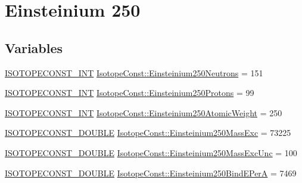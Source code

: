 \hypertarget{group___isotope_const-_einsteinium-_es250}{}\section{Einsteinium 250}
\label{group___isotope_const-_einsteinium-_es250}
\subsection*{Variables}
\begin{DoxyCompactItemize}
\item 
\mbox{\hyperlink{group___isotope_const-_macros_ga5f18360b3e99483a35c32d789e62621c}{I\+S\+O\+T\+O\+P\+E\+C\+O\+N\+S\+T\+\_\+\+I\+NT}} \mbox{\hyperlink{group___isotope_const-_einsteinium-_es250_ga4d4bc806f06901da5590238cf802968a}{Isotope\+Const\+::\+Einsteinium250\+Neutrons}} = 151
\item 
\mbox{\hyperlink{group___isotope_const-_macros_ga5f18360b3e99483a35c32d789e62621c}{I\+S\+O\+T\+O\+P\+E\+C\+O\+N\+S\+T\+\_\+\+I\+NT}} \mbox{\hyperlink{group___isotope_const-_einsteinium-_es250_gaa9b862147922a466cc8599aca2797a48}{Isotope\+Const\+::\+Einsteinium250\+Protons}} = 99
\item 
\mbox{\hyperlink{group___isotope_const-_macros_ga5f18360b3e99483a35c32d789e62621c}{I\+S\+O\+T\+O\+P\+E\+C\+O\+N\+S\+T\+\_\+\+I\+NT}} \mbox{\hyperlink{group___isotope_const-_einsteinium-_es250_ga4e0391f03f0f9ca79e9bfc2e01f3f97e}{Isotope\+Const\+::\+Einsteinium250\+Atomic\+Weight}} = 250
\item 
\mbox{\hyperlink{group___isotope_const-_macros_ga8f45a7272ce02c0b4c65c44636ed719a}{I\+S\+O\+T\+O\+P\+E\+C\+O\+N\+S\+T\+\_\+\+D\+O\+U\+B\+LE}} \mbox{\hyperlink{group___isotope_const-_einsteinium-_es250_ga86176129efcabeab11da55f3254807a8}{Isotope\+Const\+::\+Einsteinium250\+Mass\+Exc}} = 73225
\item 
\mbox{\hyperlink{group___isotope_const-_macros_ga8f45a7272ce02c0b4c65c44636ed719a}{I\+S\+O\+T\+O\+P\+E\+C\+O\+N\+S\+T\+\_\+\+D\+O\+U\+B\+LE}} \mbox{\hyperlink{group___isotope_const-_einsteinium-_es250_ga168d0659323287246d5b5eeb1832516b}{Isotope\+Const\+::\+Einsteinium250\+Mass\+Exc\+Unc}} = 100
\item 
\mbox{\hyperlink{group___isotope_const-_macros_ga8f45a7272ce02c0b4c65c44636ed719a}{I\+S\+O\+T\+O\+P\+E\+C\+O\+N\+S\+T\+\_\+\+D\+O\+U\+B\+LE}} \mbox{\hyperlink{group___isotope_const-_einsteinium-_es250_ga1ad3f8e9c11b686acce255f55d5c6a15}{Isotope\+Const\+::\+Einsteinium250\+Bind\+E\+PerA}} = 7469
\item 

\end{DoxyCompactItemize}
